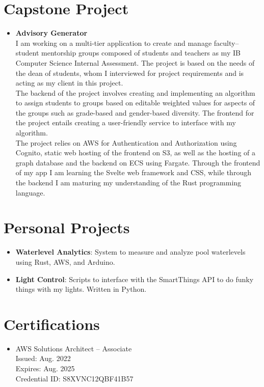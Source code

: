 \documentclass[letterpaper,11pt]{article}
\newcommand{\resumeItem}[2]{
    \item\small{
        \textbf{#1}{: #2 \vspace{-3pt}}
    }
}
\newcommand{\resumeSubItem}[2]{\resumeItem{#1}{#2}\vspace{-4pt}}
\newcommand{\resumeSubHeadingListStart}{\begin{itemize}[leftmargin=*]}
\newcommand{\resumeSubHeadingListEnd}{\end{itemize}}
\begin{document}
\section{Capstone Project}
    \resumeSubHeadingListStart
    \item[]{
    \textbf{Advisory Generator}\\
    I am working on a multi-tier application to create and manage faculty--student mentorship groups composed of students and teachers as my IB Computer Science Internal Assessment.
    The project is based on the needs of the dean of students, whom I interviewed for project requirements and is acting as my client in this project.\\
    \vspace{0.15cm}
    The backend of the project involves creating and implementing an algorithm to assign students to groups based on editable weighted values for aspects of the groups such as grade-based and gender-based diversity.
    The frontend for the project entails creating a user-friendly service to interface with my algorithm.\\
    \vspace{0.15cm}
    The project relies on AWS for Authentication and Authorization using Cognito, static web hosting of the frontend on S3, as well as the hosting of a graph database and the backend on ECS using Fargate.
    Through the frontend of my app I am learning the Svelte web framework and CSS, while through the backend I am maturing my understanding of the Rust programming language.\\
    }
    \resumeSubHeadingListEnd

\section{Personal Projects}
    \resumeSubHeadingListStart
        \resumeSubItem{Waterlevel Analytics}
            {System to measure and analyze pool waterlevels using Rust, AWS, and Arduino.}
        \resumeSubItem{Light Control}
            {Scripts to interface with the SmartThings API to do funky things with my lights. Written in Python.}
    \resumeSubHeadingListEnd


    \section{Certifications}
    \resumeSubHeadingListStart
        \item{
            AWS Solutions Architect -- Associate\\
            \hspace{.3cm}\small Issued: Aug. 2022\\
            \hspace{.3cm}\small Expires: Aug. 2025\\
            \hspace{.3cm}\small Credential ID: S8XVNC12QBF41B57\\
        }
    \resumeSubHeadingListEnd
\end{document}
